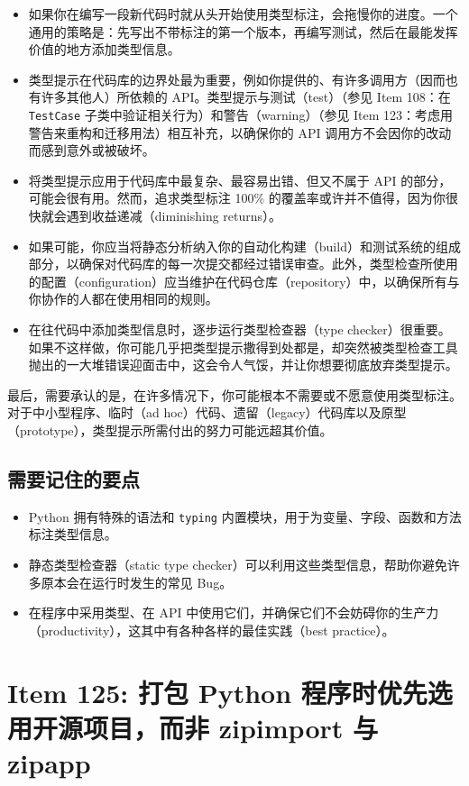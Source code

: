 \begin{itemize}
\item 如果你在编写一段新代码时就从头开始使用类型标注，会拖慢你的进度。一个通用的策略是：先写出不带标注的第一个版本，再编写测试，然后在最能发挥价值的地方添加类型信息。
\item 类型提示在代码库的边界处最为重要，例如你提供的、有许多调用方（因而也有许多其他人）所依赖的 API。类型提示与测试（test）（参见 Item 108：在 \texttt{TestCase} 子类中验证相关行为）和警告（warning）（参见 Item 123：考虑用警告来重构和迁移用法）相互补充，以确保你的 API 调用方不会因你的改动而感到意外或被破坏。
\item 将类型提示应用于代码库中最复杂、最容易出错、但又不属于 API 的部分，可能会很有用。然而，追求类型标注 100\% 的覆盖率或许并不值得，因为你很快就会遇到收益递减（diminishing returns）。
\item 如果可能，你应当将静态分析纳入你的自动化构建（build）和测试系统的组成部分，以确保对代码库的每一次提交都经过错误审查。此外，类型检查所使用的配置（configuration）应当维护在代码仓库（repository）中，以确保所有与你协作的人都在使用相同的规则。
\item 在往代码中添加类型信息时，逐步运行类型检查器（type checker）很重要。如果不这样做，你可能几乎把类型提示撒得到处都是，却突然被类型检查工具抛出的一大堆错误迎面击中，这会令人气馁，并让你想要彻底放弃类型提示。
\end{itemize}

最后，需要承认的是，在许多情况下，你可能根本不需要或不愿意使用类型标注。对于中小型程序、临时（ad hoc）代码、遗留（legacy）代码库以及原型（prototype），类型提示所需付出的努力可能远超其价值。

\subsection{需要记住的要点}

\begin{itemize}
\item Python 拥有特殊的语法和 \texttt{typing} 内置模块，用于为变量、字段、函数和方法标注类型信息。
\item 静态类型检查器（static type checker）可以利用这些类型信息，帮助你避免许多原本会在运行时发生的常见 Bug。
\item 在程序中采用类型、在 API 中使用它们，并确保它们不会妨碍你的生产力（productivity），这其中有各种各样的最佳实践（best practice）。
\end{itemize}

\section{Item 125: 打包 Python 程序时优先选用开源项目，而非 zipimport 与 zipapp}

